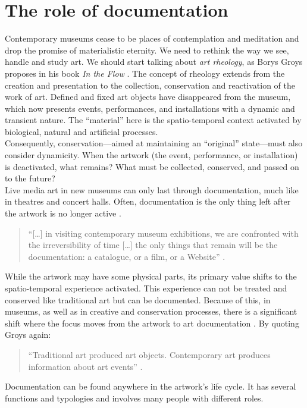 \section{The role of documentation}
Contemporary museums cease to be places of contemplation and meditation and drop the promise of materialistic eternity. We need to rethink the way we see, handle and study art. We should start talking about \textit{art rheology}, as Borys Groys proposes in his book \textit{In the Flow }\cite{groys2016flow}. The concept of rheology extends from the creation and presentation to the collection, conservation and reactivation of the work of art. Defined and fixed art objects have disappeared from the museum, which now presents events, performances, and installations with a dynamic and transient nature. The ``material'' here is the spatio-temporal context activated by biological, natural and artificial processes.\\
Consequently, conservation—aimed at maintaining an ``original'' state—must also consider dynamicity. When the artwork (the event, performance, or installation) is deactivated, what remains? What must be collected, conserved, and passed on to the future?\\
Live media art in new museums can only last through documentation, much like in theatres and concert halls. Often, documentation is the only thing left after the artwork is no longer active \cite{depocas2002digital}. 
\begin{quote}
“[…] in visiting contemporary museum exhibitions, we are confronted with the irreversibility of time […] the only things that remain will be the documentation: a catalogue, or a film, or a Website” \cite{groys2016flow}.
\end{quote}
While the artwork may have some physical parts, its primary value shifts to the spatio-temporal experience activated. This experience can not be treated and conserved like traditional art but can be documented. Because of this, in museums, as well as in creative and conservation processes, there is a significant shift where the focus moves from the artwork to art documentation \cite{groys2008art}. By quoting Groys again: 
\begin{quote}
“Traditional art produced art objects. Contemporary art produces information about art events” \cite{groys2016flow}.     
\end{quote}
Documentation can be found anywhere in the artwork's life cycle. It has several functions and typologies and involves many people with different roles.\\ 
